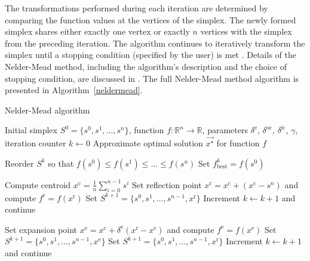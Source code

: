 The transformations performed during each iteration are determined by comparing the function values at the vertices of the simplex. The newly formed simplex shares either exactly one vertex or exactly $ n $ vertices with the simplex from the preceding iteration. The algorithm continues to iteratively transform the simplex until a stopping condition (specified by the user) is met \cite{BBO-textbook}. Details of the Nelder-Mead method, including the algorithm's description and the choice of stopping condition, are discussed in \cite{BBO-textbook, derivative-free-review, Nelder1965}. The full Nelder-Mead method algorithm is presented in Algorithm~\ref{neldermead}.

\begin{algorithm}
	\caption{Nelder-Mead algorithm}\label{neldermead}
	\begin{algorithmic}[1]
		\Require Initial simplex $S^0 = \{s^0, s^1, \dots, s^n\}$, function $f: \mathbb{R}^n \to \mathbb{R}$, parameters $\delta^{\text{e}}$, $\delta^{\text{oc}}$, $\delta^{\text{ic}}$, $\gamma$, iteration counter $k \gets 0$
		\Ensure Approximate optimal solution $\vec{x^{\star}}$ for function $f$
		
		\State Reorder $S^k$ so that $f(s^0) \leq f(s^1) \leq \dots \leq f(s^n)$
		\State Set $f^k_{\text{best}} = f(s^0)$
		
		\State Compute centroid $x^{\text{c}} = \frac{1}{n} \sum_{i=0}^{n-1} s^i$
		\State Set reflection point $x^{\text{r}} = x^{\text{c}} + (x^{\text{c}} - s^n)$ and compute $f^{\text{r}} = f(x^{\text{r}})$
		\State Set $S^{k+1} = \{s^0, s^1, \dots, s^{n-1}, x^{\text{r}}\}$
		\State Increment $k \gets k+1$ and continue
		\EndIf
		
		\State Set expansion point $x^{\text{e}} = x^{\text{c}} + \delta^{\text{e}} (x^{\text{r}} - x^{\text{c}})$ and compute $f^{\text{e}} = f(x^{\text{e}})$
		\State Set $S^{k+1} = \{s^0, s^1, \dots, s^{n-1}, x^\text{e}\}$
		\Else
		\State Set $S^{k+1} = \{s^0, s^1, \dots, s^{n-1}, x^\text{r}\}$
		\EndIf
		\State Increment $k \gets k+1$ and continue
		\EndIf
		

\end{algorithmic}
\end{algorithm}
